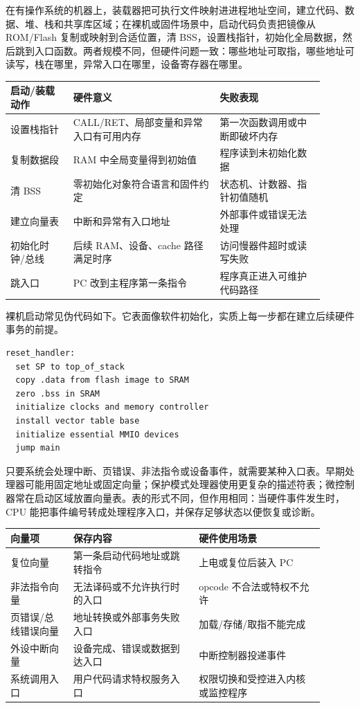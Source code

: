 在有操作系统的机器上，装载器把可执行文件映射进进程地址空间，建立代码、数据、堆、栈和共享库区域；在裸机或固件场景中，启动代码负责把镜像从 ROM/Flash 复制或映射到合适位置，清 BSS，设置栈指针，初始化全局数据，然后跳到入口函数。两者规模不同，但硬件问题一致：哪些地址可取指，哪些地址可读写，栈在哪里，异常入口在哪里，设备寄存器在哪里。

\begin{longtable}{L{0.18\linewidth}L{0.42\linewidth}L{0.3\linewidth}}
\toprule
启动/装载动作 & 硬件意义 & 失败表现 \\
\midrule
设置栈指针 & CALL/RET、局部变量和异常入口有可用内存 & 第一次函数调用或中断即破坏内存 \\
复制数据段 & RAM 中全局变量得到初始值 & 程序读到未初始化数据 \\
清 BSS & 零初始化对象符合语言和固件约定 & 状态机、计数器、指针初值随机 \\
建立向量表 & 中断和异常有入口地址 & 外部事件或错误无法处理 \\
初始化时钟/总线 & 后续 RAM、设备、cache 路径满足时序 & 访问慢器件超时或读写失败 \\
跳入口 & PC 改到主程序第一条指令 & 程序真正进入可维护代码路径 \\
\bottomrule
\end{longtable}

裸机启动常见伪代码如下。它表面像软件初始化，实质上每一步都在建立后续硬件事务的前提。

\begin{lstlisting}
reset_handler:
  set SP to top_of_stack
  copy .data from flash image to SRAM
  zero .bss in SRAM
  initialize clocks and memory controller
  install vector table base
  initialize essential MMIO devices
  jump main
\end{lstlisting}

只要系统会处理中断、页错误、非法指令或设备事件，就需要某种入口表。早期处理器可能用固定地址或固定向量；保护模式处理器使用更复杂的描述符表；微控制器常在启动区域放置向量表。表的形式不同，但作用相同：当硬件事件发生时，CPU 能把事件编号转成处理程序入口，并保存足够状态以便恢复或诊断。

\begin{longtable}{L{0.18\linewidth}L{0.36\linewidth}L{0.36\linewidth}}
\toprule
向量项 & 保存内容 & 硬件使用场景 \\
\midrule
复位向量 & 第一条启动代码地址或跳转指令 & 上电或复位后装入 PC \\
非法指令向量 & 无法译码或不允许执行时的入口 & opcode 不合法或特权不允许 \\
页错误/总线错误向量 & 地址转换或外部事务失败入口 & 加载/存储/取指不能完成 \\
外设中断向量 & 设备完成、错误或数据到达入口 & 中断控制器投递事件 \\
系统调用入口 & 用户代码请求特权服务入口 & 权限切换和受控进入内核或监控程序 \\
\bottomrule
\end{longtable}

